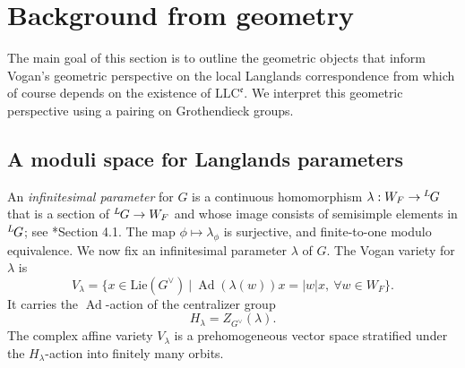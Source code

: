 \documentclass[11pt,letterpaper]{amsart}
\newcommand{\dualgroup}[1]{{#1}^\vee}
\newcommand{\Lgroup}[1]{{\hskip-2 pt \,^L\hskip-1pt{#1}}}
\newcommand{\LLC}{\mathrm{LLC}}
\DeclareMathOperator{\Ad}{Ad}
\renewcommand{\1}{\mathbbm{1}}
\numberwithin{equation}{section}
\begin{document}
{\section{Background from geometry}\label{sec: geometric LLC}
The main goal of this section is to outline the geometric objects that inform Vogan's geometric perspective on the local Langlands correspondence from \cite{Vog93} which of course depends on the existence of $\LLC^{\mathfrak{e}}$. We interpret this geometric perspective using a pairing on Grothendieck groups.

\subsection{A moduli space for Langlands parameters}\label{subsec: a moduli space for langlands parameters}
An \emph{infinitesimal parameter} for $G$ is a continuous homomorphism $\lambda: W_F \to \Lgroup{G}$ that is a section of $\Lgroup{G} \to W_F$ and whose image consists of semisimple elements in $\Lgroup{G}$; see \cite{CFMMX22}*{Section 4.1}. The map $\phi \mapsto \lambda_\phi$ is surjective, and finite-to-one modulo equivalence.  We now fix an infinitesimal parameter $\lambda$ of $G$. The Vogan variety for $\lambda$ is 
\begin{equation}\label{equation: vogan variety}
    V_\lambda=\{x \in \mathrm{Lie}(\dualgroup{G})~ \vert ~ \Ad(\lambda(w))x=|w|x, ~\forall w\in W_F \}.
\end{equation}
It carries the $\Ad$-action of the centralizer group
\begin{equation}\label{equation: h lambda}
    H_\lambda=Z_{\dualgroup{G}}(\lambda).
\end{equation}
The complex affine variety $V_\lambda$ is a prehomogeneous vector space stratified under the $H_\lambda$-action into finitely many orbits. 

}
\end{document}
